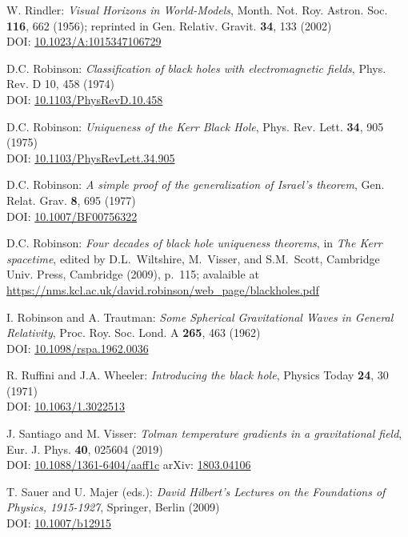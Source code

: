 \begin{thebibliography}{123}
W. Rindler: {\em Visual Horizons in World-Models},
Month. Not. Roy. Astron. Soc. {\bf 116}, 662 (1956);
reprinted in Gen. Relativ. Gravit. {\bf 34}, 133 (2002)\\
DOI: \href{https://doi.org/10.1023/A:1015347106729}{10.1023/A:1015347106729}

D.C. Robinson:
{\em Classification of black holes with electromagnetic fields},
Phys. Rev. D 10, 458 (1974)\\
DOI: \href{https://doi.org/10.1103/PhysRevD.10.458}{10.1103/PhysRevD.10.458}

D.C. Robinson:
{\em Uniqueness of the Kerr Black Hole},
Phys. Rev. Lett. {\bf 34}, 905 (1975)\\
DOI: \href{https://doi.org/10.1103/PhysRevLett.34.905}{10.1103/PhysRevLett.34.905}

D.C. Robinson:
{\em A simple proof of the generalization of Israel's theorem},
Gen. Relat. Grav. {\bf 8}, 695 (1977)\\
DOI: \href{https://doi.org/10.1007/BF00756322}{10.1007/BF00756322}

D.C. Robinson:
{\em Four decades of black hole uniqueness theorems},
in {\em The Kerr spacetime}, edited by D.L.~Wiltshire, M.~Visser, and S.M.~Scott,
Cambridge Univ. Press, Cambridge (2009), p.~115; avalaible at\\
\url{https://nms.kcl.ac.uk/david.robinson/web_page/blackholes.pdf}

I. Robinson and A. Trautman:
{\em Some Spherical Gravitational Waves in General Relativity},
Proc. Roy. Soc. Lond. A {\bf 265}, 463 (1962)\\
DOI: \href{https://doi.org/10.1098/rspa.1962.0036}{10.1098/rspa.1962.0036}

R. Ruffini and J.A. Wheeler:
{\em Introducing the black hole},
Physics Today {\bf 24}, 30 (1971)\\
DOI: \href{https://doi.org/10.1063/1.3022513}{10.1063/1.3022513}

J. Santiago and M. Visser:
{\em Tolman temperature gradients in a gravitational field},
Eur. J. Phys. {\bf 40}, 025604 (2019)\\
DOI: \href{https://doi.org/10.1088/1361-6404/aaff1c}{10.1088/1361-6404/aaff1c}\hfill
arXiv: \href{https://arxiv.org/abs/1803.04106}{1803.04106}

T. Sauer and U. Majer (eds.):
{\em David Hilbert’s Lectures on the Foundations of Physics, 1915-1927},
Springer, Berlin (2009)\\
DOI: \href{https://doi.org/10.1007/b12915}{10.1007/b12915}


\end{thebibliography}
